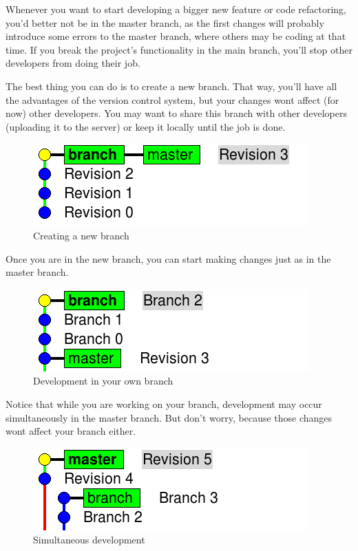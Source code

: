 \documentclass[a4paper,10pt]{article}
\begin{document}
Whenever you want to start developing a bigger new feature or code
refactoring, you'd better not be in the master branch, as the first
changes will probably introduce some errors to the master branch, where
others may be coding at that time. If you break the project's
functionality in the main branch, you'll stop other developers from
doing their job.

The best thing you can do is to create a new branch. That way, you'll
have all the advantages of the version control system, but your changes
wont affect (for now) other developers. You may want to share this
branch with other developers (uploading it to the server) or keep it
locally until the job is done.

\begin{figure}[h]
  \begin{center}
    \includegraphics[scale=0.5]{branching-01}
  \end{center}
  \caption{Creating a new branch}
\end{figure}

Once you are in the new branch, you can start making changes just as in
the master branch.

\begin{figure}[h]
  \begin{center}
    \includegraphics[scale=0.5]{branching-02}
  \end{center}
  \caption{Development in your own branch}
\end{figure}

Notice that while you are working on your branch, development may occur
simultaneously in the master branch. But don't worry, because those
changes wont affect your branch either.

\begin{figure}[h]
  \begin{center}
    \includegraphics[scale=0.5]{branching-03}
  \end{center}
  \caption{Simultaneous development}
\end{figure}
\end{document}
